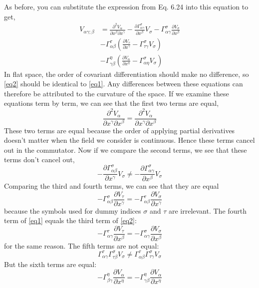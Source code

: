 As before, you can substitute the expression from Eq. 6.24 into this equation to get,
\begin{equation} \label{eq2}
\begin{split}
	V_{\alpha \gamma;\beta } & = \frac{\partial^{2} V_{\alpha}}{\partial x^{\beta} \partial x^{ \gamma}} - \frac{\partial \Gamma^{\sigma}_{\alpha \gamma}}{\partial x^{\beta	}}V_{\sigma}- \Gamma^{\sigma}_{\alpha \gamma} \frac{\partial V_{\sigma}}{\partial x^{\beta}} \\
	& - \Gamma^{\tau}_{\alpha \beta} \left( \frac{\partial V_{\tau}}{\partial x^{\gamma}} -\Gamma^{\sigma}_{\tau \gamma} V_{\sigma} \right)\\
	& - \Gamma^{\eta}_{\gamma \beta} \left( \frac{\partial V_{\alpha}}{\partial x^{\eta}} -\Gamma^{\sigma}_{\alpha \eta} V_{\sigma} \right)
\end{split}	
\end{equation}
In flat space, the order of covariant differentiation should make no difference, so \ref{eq2} should be identical to \ref{eq1}. Any differences between these equations can therefore be attributed to the curvature of the space. If we examine these equations term by term, we can see that the first two terms are equal,
$$\frac{\partial^{2} V_{\alpha}}{\partial x^{\gamma} \partial x^{\beta}} = \frac{\partial^{2} V_{\alpha}}{\partial x^{\gamma} \partial x^{\beta}}$$
These two terms are equal because the order of applying partial derivatives doesn't matter when the field we consider is continuous. Hence these terms cancel out in the commutator. Now if we compare the second terms, we see that these terms don't cancel out,
$$-\frac{\partial \Gamma^{\sigma}_{\alpha \beta}}{\partial x^{\gamma}}V_{\sigma} \neq -\frac{\partial \Gamma^{\sigma}_{\alpha \gamma}}{\partial x^{\beta}}V_{\sigma}$$
Comparing the third and fourth terms, we can see that they are equal
$$-\Gamma^{\sigma}_{\alpha \beta} \frac{\partial V_{\tau}}{\partial x^{\gamma}} = -\Gamma^{\tau}_{\alpha \beta}\frac{\partial V_{\sigma}}{\partial x^{\gamma}}$$
because the symbols used for dummy indices $\sigma$ and $\tau$ are irrelevant. The fourth term of \ref{eq1} equals the third term of \ref{eq2}:
$$-\Gamma^{\tau}_{\alpha \gamma} \frac{\partial V_{\tau}}{\partial x^{\beta}} = -\Gamma^{\sigma}_{\alpha \gamma}\frac{\partial V_{\sigma}}{\partial x^{\beta}}$$
for the same reason. The fifth terms are not equal:
$$\Gamma^{\tau}_{\alpha \gamma}\Gamma^{\sigma}_{\tau \beta} V_{\sigma} \neq \Gamma^{\tau}_{\alpha \beta}\Gamma^{\sigma}_{\tau \gamma} V_{\sigma}$$
But the sixth terms are equal:
$$-\Gamma^{\eta}_{\beta \gamma} \frac{\partial V_{\alpha}}{\partial x^{\eta}} = -\Gamma^{\eta}_{\gamma \beta}\frac{ \partial V_{\alpha}}{\partial x^{\eta}}$$

